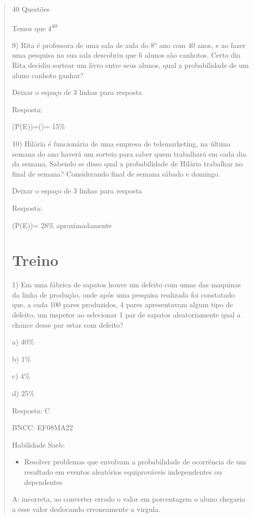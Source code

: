 \begin{quote}
\begin{escolha}
40 Questões

Temos que 4\textsuperscript{40}

9) Rita é professora de uma sala de aula do 8° ano com 40 anos, e ao
fazer uma pesquisa na sua sala descobriu que 6 alunos são canhotos.
Certo dia Rita decidiu sortear um livro entre seus alunos, qual a
probabilidade de um aluno canhoto ganhar?

Deixar o espaço de 3 linhas para resposta

Resposta:

(P(E))=()= 15\%

10) Hilária é funcionária de uma empresa de telemarketing, na última
semana do ano haverá um sorteio para saber quem trabalhará em cada dia
da semana, Sabendo se disso qual a probabilidade de Hilária trabalhar no
final de semana? Considerando final de semana sábado e domingo.

Deixar o espaço de 3 linhas para resposta

Resposta:

(P(E))= 28\% aproximadamente

\section{Treino}

1) Em uma fábrica de sapatos houve um defeito com umas das maquinas da
linha de produção, onde após uma pesquisa realizada foi constatado que,
a cada 100 pares produzidos, 4 pares apresentavam algum tipo de defeito,
um inspetor ao selecionar 1 par de sapatos aleatoriamente qual a chance
desse par estar com defeito?

a) 40\%

b) 1\%

c) 4\%

d) 25\%

Resposta: C

BNCC: EF08MA22

Habilidade Saeb:

\begin{itemize}
\tightlist
\item
  Resolver problemas que envolvam a probabilidade de ocorrência de um
  resultado em eventos aleatórios equiprováveis independentes ou
  dependentes
\end{itemize}

A: incorreta, ao converter errado o valor em porcentagem o aluno
chegaria a esse valor deslocando erroneamente a virgula.


\end{escolha}
\end{quote}
